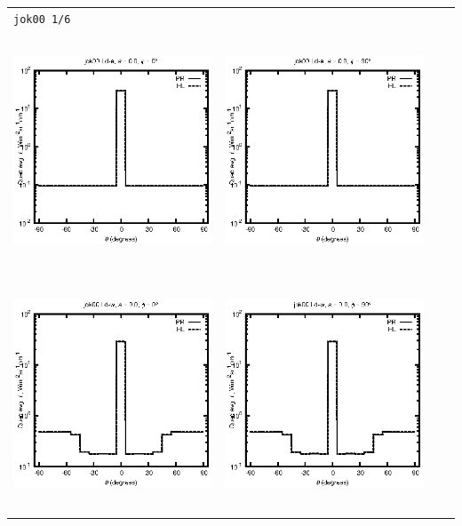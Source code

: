 
\pagebreak

\begin{tabular}{c c c c}
\multicolumn{4}{l}{\texttt{jok00 1/6}} \\
\includegraphics[height=7cm]{../eps/jok00_Ld_a_fwd.eps} &
\includegraphics[height=7cm]{../eps/jok00_Ld_a_cross.eps}\\
\includegraphics[height=7cm]{../eps/jok00_Ld_w_fwd.eps} &
\includegraphics[height=7cm]{../eps/jok00_Ld_w_cross.eps} \\

\end{tabular}
